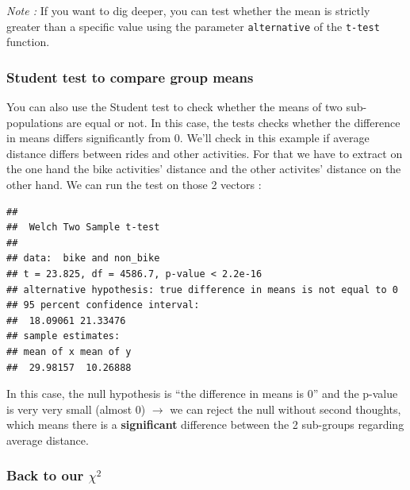 \documentclass[
]{book}
\newenvironment{Shaded}{\begin{snugshade}}{\end{snugshade}}
\newcommand{\KeywordTok}[1]{\textcolor[rgb]{0.13,0.29,0.53}{\textbf{#1}}}
\newcommand{\NormalTok}[1]{#1}
\newcommand{\OperatorTok}[1]{\textcolor[rgb]{0.81,0.36,0.00}{\textbf{#1}}}
\newcommand{\StringTok}[1]{\textcolor[rgb]{0.31,0.60,0.02}{#1}}
\begin{document}
\emph{Note : } If you want to dig deeper, you can test whether the mean is strictly greater than a specific value using the parameter \texttt{alternative} of the \texttt{t-test} function.

\hypertarget{student-test-to-compare-group-means}{%
\subsubsection{Student test to compare group means}\label{student-test-to-compare-group-means}}

You can also use the Student test to check whether the means of two sub-populations are equal or not. In this case, the tests checks whether the difference in means differs significantly from 0. We'll check in this example if average distance differs between rides and other activities.
For that we have to extract on the one hand the bike activities' distance and the other activites' distance on the other hand. We can run the test on those 2 vectors :

\begin{Shaded}
\end{Shaded}

\begin{verbatim}
## 
## 	Welch Two Sample t-test
## 
## data:  bike and non_bike
## t = 23.825, df = 4586.7, p-value < 2.2e-16
## alternative hypothesis: true difference in means is not equal to 0
## 95 percent confidence interval:
##  18.09061 21.33476
## sample estimates:
## mean of x mean of y 
##  29.98157  10.26888
\end{verbatim}

In this case, the null hypothesis is ``the difference in means is 0'' and the p-value is very very small (almost 0) \(\rightarrow\) we can reject the null without second thoughts, which means there is a \textbf{significant} difference between the 2 sub-groups regarding average distance.

\hypertarget{back-to-our-chi2}{%
\subsubsection{\texorpdfstring{Back to our \(\chi^2\)}{Back to our \textbackslash chi\^{}2}}\label{back-to-our-chi2}}
\end{document}
